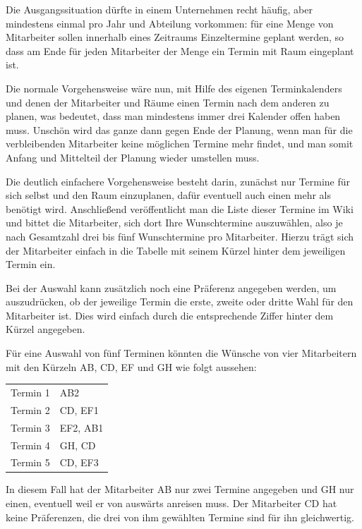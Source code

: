 Die Ausgangssituation dürfte in einem Unternehmen recht häufig, aber mindestens einmal pro Jahr und Abteilung vorkommen: für eine Menge von Mitarbeiter sollen innerhalb eines Zeitraums Einzeltermine geplant werden, so dass am Ende für jeden Mitarbeiter der Menge ein Termin mit Raum eingeplant ist.

Die normale Vorgehensweise wäre nun, mit Hilfe des eigenen Terminkalenders und denen der Mitarbeiter und Räume einen Termin nach dem anderen zu planen, was bedeutet, dass man mindestens immer drei Kalender offen haben muss. Unschön wird das ganze dann gegen Ende der Planung, wenn man für die verbleibenden Mitarbeiter keine möglichen Termine mehr findet, und man somit Anfang und Mittelteil der Planung wieder umstellen muss.

Die deutlich einfachere Vorgehensweise besteht darin, zunächst nur Termine für sich selbst und den Raum einzuplanen, dafür eventuell auch einen mehr als benötigt wird. Anschließend veröffentlicht man die Liste dieser Termine im Wiki und bittet die Mitarbeiter, sich dort Ihre Wunschtermine auszuwählen, also je nach Gesamtzahl drei bis fünf Wunschtermine pro Mitarbeiter. Hierzu trägt sich der Mitarbeiter einfach in die Tabelle mit seinem Kürzel hinter dem jeweiligen Termin ein.

Bei der Auswahl kann zusätzlich noch eine Präferenz angegeben werden, um auszudrücken, ob der jeweilige Termin die erste, zweite oder dritte Wahl für den Mitarbeiter ist. Dies wird einfach durch die entsprechende Ziffer hinter dem Kürzel angegeben.

Für eine Auswahl von fünf Terminen könnten die Wünsche von vier Mitarbeitern mit den Kürzeln AB, CD, EF und GH wie folgt aussehen:

\begin{center}
\begin{tabular}{|c|l|}\hline
Termin 1& AB2\\
Termin 2& CD, EF1\\
Termin 3& EF2, AB1\\
Termin 4& GH, CD\\
Termin 5& CD, EF3\\ \hline
\end{tabular}
\end{center}

In diesem Fall hat der Mitarbeiter AB nur zwei Termine angegeben und GH nur einen, eventuell weil er von auswärts anreisen muss. Der Mitarbeiter CD hat keine Präferenzen, die drei von ihm gewählten Termine sind für ihn gleichwertig.


